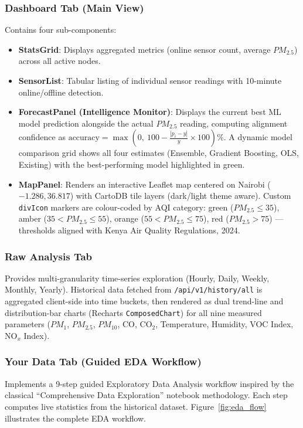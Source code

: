 \subsubsection{Dashboard Tab (Main View)}
Contains four sub-components:
\begin{itemize}[nosep]
    \item \textbf{StatsGrid}: Displays aggregated metrics (online sensor count, average $PM_{2.5}$) across all active nodes.
    \item \textbf{SensorList}: Tabular listing of individual sensor readings with 10-minute online/offline detection.
    \item \textbf{ForecastPanel (Intelligence Monitor)}: Displays the current best ML model prediction alongside the actual $PM_{2.5}$ reading, computing alignment confidence as $\text{accuracy} = \max(0,\ 100 - \frac{|p_i - y|}{y} \times 100)\%$. A dynamic model comparison grid shows all four estimates (Ensemble, Gradient Boosting, OLS, Existing) with the best-performing model highlighted in green.
    \item \textbf{MapPanel}: Renders an interactive Leaflet map centered on Nairobi ($-1.286, 36.817$) with CartoDB tile layers (dark/light theme aware). Custom \texttt{divIcon} markers are colour-coded by AQI category: green ($PM_{2.5} \leq 35$), amber ($35< PM_{2.5} \leq 55$), orange ($55< PM_{2.5} \leq 75$), red ($PM_{2.5} > 75$) --- thresholds aligned with Kenya Air Quality Regulations, 2024.
\end{itemize}

\figMethodologyIntelligenceMonitor

\subsubsection{Raw Analysis Tab}
Provides multi-granularity time-series exploration (Hourly, Daily, Weekly, Monthly, Yearly). Historical data fetched from \texttt{/api/v1/history/all} is aggregated client-side into time buckets, then rendered as dual trend-line and distribution-bar charts (Recharts \texttt{ComposedChart}) for all nine measured parameters ($PM_1$, $PM_{2.5}$, $PM_{10}$, CO, CO$_2$, Temperature, Humidity, VOC Index, NO$_x$ Index).

\subsubsection{Your Data Tab (Guided EDA Workflow)}
Implements a 9-step guided Exploratory Data Analysis workflow inspired by the classical ``Comprehensive Data Exploration'' notebook methodology. Each step computes live statistics from the historical dataset. Figure~\ref{fig:eda_flow} illustrates the complete EDA workflow.


